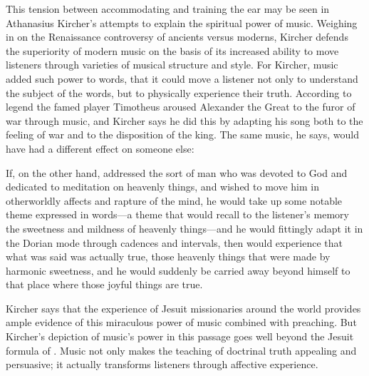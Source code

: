 This tension between accommodating and training the ear may be seen in
Athanasius Kircher's attempts to explain the spiritual power of music.
Weighing in on the Renaissance controversy of ancients versus moderns, Kircher
defends the superiority of modern music on the basis of its increased ability
to move listeners through varieties of musical structure and style.%
    \Autocite[, ]{Kircher:Musurgia}
For Kircher, music added such power to words, that it could move a listener not
only to understand the subject of the words, but to physically experience their
truth.
According to legend the famed  player Timotheus aroused Alexander
the Great to the furor of war through music, and Kircher says he did this by
adapting his song both to the feeling of war and to the disposition of the
king.%
    \Autocites
    [Cf.][90]{Galilei:Dialogo}
    {Dryden:Alexander}
The same music, he says, would have had a different effect on someone else:
\begin{quoting}
    If, on the other hand,  addressed the sort of man who was
    devoted to God and dedicated to meditation on heavenly things, and wished to
    move him in otherworldly affects and rapture of the mind, he would take up
    some notable theme expressed in words---a theme that would recall to the
    listener's memory the sweetness and mildness of heavenly things---and he
    would fittingly adapt it in the Dorian mode through cadences and intervals,
    then  would experience that what was said was actually
    true, those heavenly things that were made by harmonic sweetness, and he
    would suddenly be carried away beyond himself to that place where those
    joyful things are true.%
        \Autocite[, ]{Kircher:Musurgia}
\end{quoting}
Kircher says that the experience of Jesuit missionaries around the world
provides ample evidence of this miraculous power of music combined with
preaching.
But Kircher's depiction of music's power in this passage goes well beyond the
Jesuit formula of .%
    \Autocite[35--51]{Bailey:Art}
Music not only makes the teaching of doctrinal truth appealing and persuasive;
it actually transforms listeners through affective experience.


